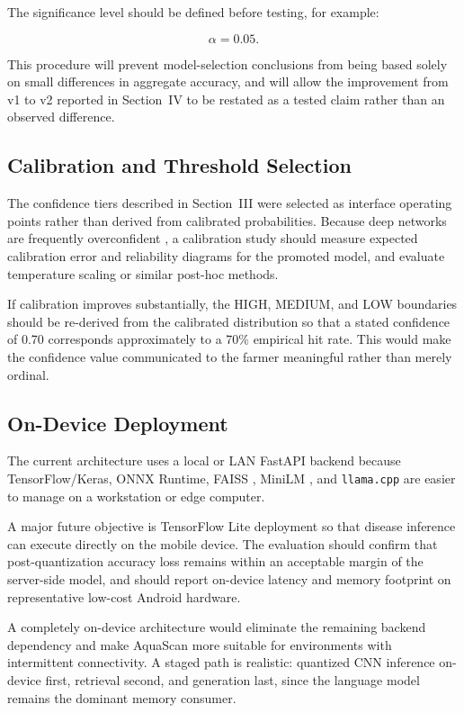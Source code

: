 \documentclass[conference]{IEEEtran}
\begin{document}
The significance level should be defined before testing, for example:

\begin{equation}
\alpha=0.05.
\end{equation}

This procedure will prevent model-selection conclusions from being based solely on small differences in aggregate accuracy, and will allow the improvement from v1 to v2 reported in Section~IV to be restated as a tested claim rather than an observed difference.

\subsection{Calibration and Threshold Selection}

The confidence tiers described in Section~III were selected as interface operating points rather than derived from calibrated probabilities. Because deep networks are frequently overconfident \cite{b23}, a calibration study should measure expected calibration error and reliability diagrams for the promoted model, and evaluate temperature scaling or similar post-hoc methods.

If calibration improves substantially, the HIGH, MEDIUM, and LOW boundaries should be re-derived from the calibrated distribution so that a stated confidence of 0.70 corresponds approximately to a 70\% empirical hit rate. This would make the confidence value communicated to the farmer meaningful rather than merely ordinal.

\subsection{On-Device Deployment}

The current architecture uses a local or LAN FastAPI backend \cite{b15} because TensorFlow/Keras, ONNX Runtime, FAISS \cite{b6}, MiniLM \cite{b5}, and \texttt{llama.cpp} \cite{b13} are easier to manage on a workstation or edge computer.

A major future objective is TensorFlow Lite deployment \cite{b31} so that disease inference can execute directly on the mobile device. The evaluation should confirm that post-quantization accuracy loss remains within an acceptable margin of the server-side model, and should report on-device latency and memory footprint on representative low-cost Android hardware.

A completely on-device architecture would eliminate the remaining backend dependency and make AquaScan more suitable for environments with intermittent connectivity. A staged path is realistic: quantized CNN inference on-device first, retrieval second, and generation last, since the language model remains the dominant memory consumer.
\end{document}
